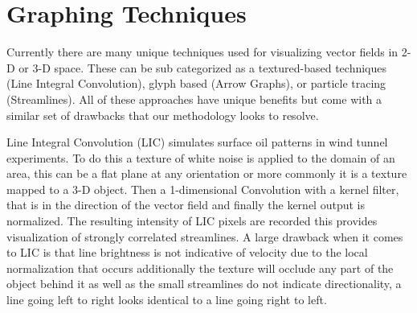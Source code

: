 \section{Graphing Techniques}

Currently there are many unique techniques used for visualizing vector fields in 2-D or 3-D space. These can be sub categorized as a textured-based techniques (Line Integral Convolution), glyph based (Arrow Graphs), or particle tracing (Streamlines). All of these approaches have unique benefits but come with a similar set of drawbacks that our methodology looks to resolve.\par

Line Integral Convolution (LIC) simulates surface oil patterns in wind tunnel experiments. To do this a texture of white noise is applied to the domain of an area, this can be a flat plane at any orientation or more commonly it is a texture mapped to a 3-D object.  Then a 1-dimensional Convolution with a kernel filter, that is in the direction of the vector field and finally the kernel output is normalized.\cite{Cabral1993} The resulting intensity of LIC pixels are recorded this provides visualization of strongly correlated streamlines. A large drawback when it comes to LIC is that line brightness is not indicative of velocity due to the local normalization that occurs additionally the texture will occlude any part of the object behind it as well as the small streamlines do not indicate directionality, a line going left to right looks identical to a line going right to left. \cite{LIC}\par

